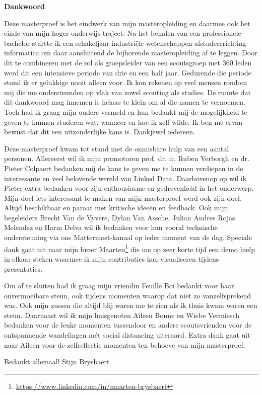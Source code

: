 \thispagestyle{empty}    %

\begin{center}
\textbf{Dankwoord}
\end{center}

Deze masterproef is het eindwerk van mijn masteropleiding en daarmee ook het einde van mijn hoger onderwijs traject. Na het behalen van een professionele bachelor startte ik een schakeljaar industriële wetenschappen afstudeerrichting informatica om daar aansluitend de bijhorende masteropleiding af te leggen. Door dit te combineren met de rol als groepsleider van een scoutsgroep met 360 leden werd dit een intensieve periode van drie en een half jaar. Gedurende die periode stond ik er gelukkige nooit alleen voor. Ik kon rekenen op veel mensen rondom mij die me ondersteunden op vlak van zowel scouting als studies. De ruimte dat dit dankwoord mag innemen is helaas te klein om al die namen te vernoemen. Toch had ik graag mijn ouders vermeld en hun bedankt mij de mogelijkheid te geven te kunnen studeren wat, wanneer en hoe ik zelf wilde. Ik ben me ervan bewust dat dit een uitzonderlijke kans is. Dankjewel iedereen.

Deze masterproef kwam tot stand met de onmisbare hulp van een aantal personen. Allereerst wil ik mijn promotoren prof. dr. ir. Ruben Verborgh en dr. Pieter Colpaert bedanken mij de kans te geven me te kunnen verdiepen in de interessante en veel belovende wereld van Linked Data. Daarbovenop op wil ik Pieter extra bedanken voor zijn enthousiasme en gedrevenheid in het onderwerp. Mijn doel iets interessant te maken van mijn masterproef werd ook zijn doel. Altijd beschikbaar en paraat met kritische ideeën en feedback. Ook mijn begeleiders Brecht Van de Vyvere, Dylan Van Assche, Julian Andres Rojas Melendez en Harm Delva wil ik bedanken voor hun vooral technische ondersteuning via ons Mattermost-kanaal op ieder moment van de dag. Speciale dank gaat uit naar mijn broer Maarten\footnote{\url{https://www.linkedin.com/in/maarten-brysbaert}} die me op zeer korte tijd een demo hielp in elkaar steken waarmee ik mijn contributies kon visualiseren tijdens presentaties.

Om af te sluiten had ik graag mijn vriendin Feuille Boi bedankt voor haar onvermoeibare steun, ook tijdens momenten waarop dat niet zo vanzelfsprekend was. Ook mijn zussen die altijd blij waren me te zien als ik thuis kwam waren een steun. Daarnaast wil ik mijn huisgenoten Aileen Bonne en Wiebe Vermiesch bedanken voor de leuke momenten tussendoor en andere scoutsvrienden voor de ontspannende wandelingen mét social distancing uiteraard. Extra dank gaat uit naar Aileen voor de zelfreflectie momenten ten behoeve van mijn masterproef.

Bedankt allemaal!
\newline
Stijn Brysbaert